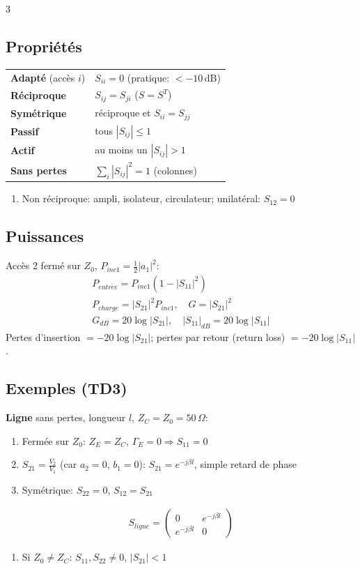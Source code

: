 \documentclass[12pt, a4paper]{article}
\begin{document}
\begin{multicols*}{3}
	\subsection{Propriétés}
	\begin{tabular}{|l|l|}
		\hline
		\textbf{Adapté} (accès $i$) & $S_{ii}=0$ (pratique: $<-10$\,dB) \\
		\textbf{Réciproque}       & $S_{ij}=S_{ji}$ ($S=S^T$)                   \\
		\textbf{Symétrique}       & réciproque et $S_{ii}=S_{jj}$               \\
		\textbf{Passif}           & tous $|S_{ij}|\leq1$                        \\
		\textbf{Actif}            & au moins un $|S_{ij}|>1$                    \\
		\textbf{Sans pertes}      & $\sum_i|S_{ij}|^2=1$ (colonnes)             \\
		\hline
	\end{tabular}
	\begin{enumerate}[\roman*.]
		\item Non réciproque: ampli, isolateur, circulateur; unilatéral: $S_{12}=0$
	\end{enumerate}

	\subsection{Puissances}
	Accès 2 fermé sur $Z_0$, $P_{inc1}=\frac12|a_1|^2$:
	\begin{gather*}
		P_{entr\acute ee}=P_{inc1}(1-|S_{11}|^2)\\
		P_{charge}=|S_{21}|^2P_{inc1},\quad G=|S_{21}|^2\\
		G_{dB}=20\log|S_{21}|,\quad|S_{11}|_{dB}=20\log|S_{11}|
	\end{gather*}
	Pertes d'insertion $=-20\log|S_{21}|$; pertes par retour (return loss) $=-20\log|S_{11}|$.

	\colbreak
	\subsection{Exemples (TD3)}
	\textbf{Ligne} sans pertes, longueur $l$, $Z_C=Z_0=50\,\Omega$:
	\begin{enumerate}[\roman*.]
		\item Fermée sur $Z_0$: $Z_E=Z_C$, $\Gamma_E=0\Rightarrow S_{11}=0$
		\item $S_{21}=\frac{V_2}{V_1}$ (car $a_2=0$, $b_1=0$): $S_{21}=e^{-j\beta l}$, simple retard de phase
		\item Symétrique: $S_{22}=0$, $S_{12}=S_{21}$
	\end{enumerate}
	\begin{gather*}
		S_{ligne}=\begin{pmatrix}0&e^{-j\beta l}\\e^{-j\beta l}&0\end{pmatrix}
	\end{gather*}
	\begin{enumerate}[\roman*.]
		\item Si $Z_0\neq Z_C$: $S_{11},S_{22}\neq0$, $|S_{21}|<1$
	\end{enumerate}


\end{multicols*}
\end{document}
